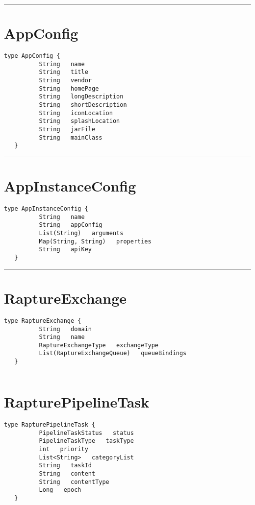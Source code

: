 \rule{12cm}{2pt}
\section{AppConfig}
\label{type:AppConfig}

\begin{lstlisting}[style=nonumbers]
   type AppConfig {
          String   name
          String   title
          String   vendor
          String   homePage
          String   longDescription
          String   shortDescription
          String   iconLocation
          String   splashLocation
          String   jarFile
          String   mainClass
   }
\end{lstlisting}

\rule{12cm}{2pt}
\section{AppInstanceConfig}
\label{type:AppInstanceConfig}

\begin{lstlisting}[style=nonumbers]
   type AppInstanceConfig {
          String   name
          String   appConfig
          List(String)   arguments
          Map(String, String)   properties
          String   apiKey
   }
\end{lstlisting}

\rule{12cm}{2pt}
\section{RaptureExchange}
\label{type:RaptureExchange}

\begin{lstlisting}[style=nonumbers]
   type RaptureExchange {
          String   domain
          String   name
          RaptureExchangeType   exchangeType
          List(RaptureExchangeQueue)   queueBindings
   }
\end{lstlisting}

\rule{12cm}{2pt}
\section{RapturePipelineTask}
\label{type:RapturePipelineTask}

\begin{lstlisting}[style=nonumbers]
   type RapturePipelineTask {
          PipelineTaskStatus   status
          PipelineTaskType   taskType
          int   priority
          List<String>   categoryList
          String   taskId
          String   content
          String   contentType
          Long   epoch
   }
\end{lstlisting}

